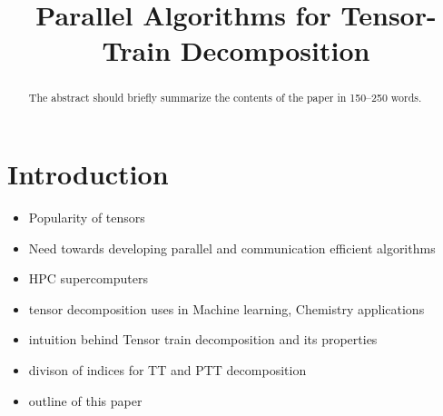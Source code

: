\documentclass[runningheads]{llncs}
\begin{document}
%
\title{Parallel Algorithms for Tensor-Train Decomposition}
\author{}
\institute{}
\maketitle              %

\begin{abstract}
The abstract should briefly summarize the contents of the paper in
150--250 words.

\end{abstract}

\section{Introduction}
\label{sec:introduction}
\begin{itemize}
	\item Popularity of tensors
	\item Need towards developing parallel and communication efficient algorithms
	\item HPC supercomputers
	\item tensor decomposition uses in Machine learning, Chemistry applications
	\item intuition behind Tensor train decomposition and its properties
	\item divison of indices for TT and PTT decomposition
	\item outline of this paper
\end{itemize}
\end{document}
